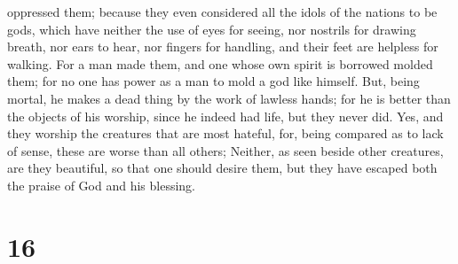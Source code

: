 oppressed them;  because they even considered all the
idols of the nations to be gods, which have neither the use of eyes for
seeing, nor nostrils for drawing breath, nor ears to hear, nor fingers
for handling, and their feet are helpless for walking. 
For a man made them, and one whose own spirit is borrowed molded them;
for no one has power as a man to mold a god like himself.
 But, being mortal, he makes a dead thing by the work of
lawless hands; for he is better than the objects of his worship, since
he indeed had life, but they never did.  Yes, and they
worship the creatures that are most hateful, for, being compared as to
lack of sense, these are worse than all others;  Neither,
as seen beside other creatures, are they beautiful, so that one should
desire them, but they have escaped both the praise of God and his
blessing.

\hypertarget{section-15}{%
\section{16}\label{section-15}}

